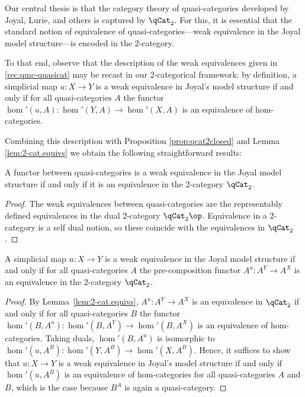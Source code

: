   Our central thesis is that the category theory of quasi-categories developed by Joyal, Lurie, and others is captured by $\qCat_2$. For this, it is essential that the standard notion of equivalence of quasi-categories---weak equivalence in the Joyal model structure---is encoded in the 2-category.

  To that end, observe that the description of the weak equivalences given in \ref{rec:qmc-quasicat} may be recast in our 2-categorical framework: by definition, a simplicial map $u\colon X\to Y$ is a weak equivalence in Joyal's model structure if and only if for all quasi-categories $A$ the functor $\hom'(u,A)\colon\hom'(Y,A)\to\hom'(X,A)$ is an equivalence of hom-categories.

  Combining this description with Proposition \ref{prop:qcat2closed} and Lemma \ref{lem:2-cat.equivs} we obtain the following straightforward results:

\begin{prop}\label{prop:equivsareequivs} A functor between quasi-categories is a weak equivalence in the Joyal model structure if and only if it is an equivalence in the 2-category $\qCat_2$.
\end{prop}
\begin{proof}
The weak equivalences between quasi-categories are the representably defined equivalences in the dual 2-category $\qCat_2\op$. Equivalence in a 2-category is a self dual notion, so these coincide with the equivalences in $\qCat_2$.
\end{proof}

\begin{prop}\label{prop:equivsareequivs2}
  A simplicial map $u\colon X\to Y$ is a weak equivalence in the Joyal model structure if and only if for all quasi-categories $A$ the pre-composition functor $A^u\colon A^Y\to A^X$ is an equivalence in the 2-category $\qCat_2$.
\end{prop}

\begin{proof}
  By Lemma~\ref{lem:2-cat.equivs}, $A^u\colon A^Y\to A^X$ is an equivalence in $\qCat_2$ if and only if for all quasi-categories $B$ the functor $\hom'(B,A^u) \colon \hom'(B,A^Y) \to \hom'(B,A^X)$ is an equivalence of hom-categories. Taking duals, $\hom'(B,A^u)$ is isomorphic to $\hom'(u,A^B) \colon \hom'(Y,A^B) \to \hom'(X,A^B)$. Hence, it suffices to show that  $u\colon X\to Y$ is a weak equivalence in Joyal's model structure if and only if $\hom'(u, A^B)$ is an equivalence of hom-categories for all quasi-categories $A$ and $B$, which is the case because $B^A$ is again a quasi-category.
\end{proof}

